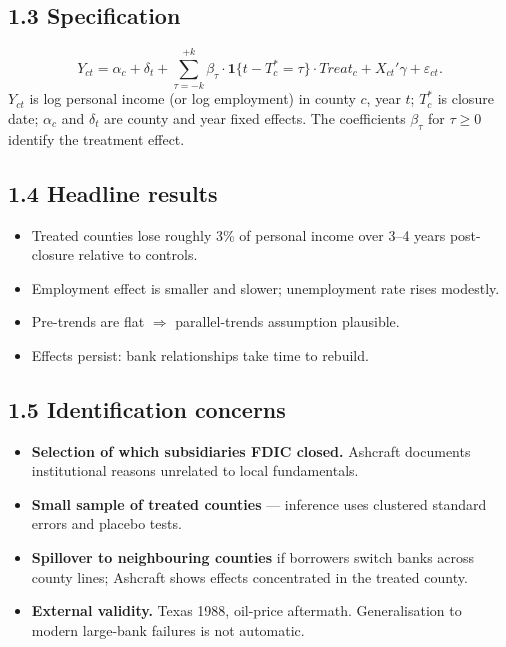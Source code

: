 \documentclass[11pt]{article}
\begin{document}
\subsection*{1.3 Specification}
\[
Y_{ct} = \alpha_c + \delta_t + \sum_{\tau=-k}^{+k}\beta_\tau\cdot\mathbf 1\{t-T_c^* = \tau\}\cdot Treat_c + X_{ct}'\gamma + \varepsilon_{ct}.
\]
$Y_{ct}$ is log personal income (or log employment) in county $c$, year $t$; $T_c^*$ is closure date; $\alpha_c$ and $\delta_t$ are county and year fixed effects. The coefficients $\beta_\tau$ for $\tau\ge 0$ identify the treatment effect.

\subsection*{1.4 Headline results}
\begin{itemize}
\item Treated counties lose roughly 3\% of personal income over 3--4 years post-closure relative to controls.
\item Employment effect is smaller and slower; unemployment rate rises modestly.
\item Pre-trends are flat $\Rightarrow$ parallel-trends assumption plausible.
\item Effects persist: bank relationships take time to rebuild.
\end{itemize}

\subsection*{1.5 Identification concerns}
\begin{alertbox}
\begin{itemize}
\item \textbf{Selection of which subsidiaries FDIC closed.} Ashcraft documents institutional reasons unrelated to local fundamentals.
\item \textbf{Small sample of treated counties} --- inference uses clustered standard errors and placebo tests.
\item \textbf{Spillover to neighbouring counties} if borrowers switch banks across county lines; Ashcraft shows effects concentrated in the treated county.
\item \textbf{External validity.} Texas 1988, oil-price aftermath. Generalisation to modern large-bank failures is not automatic.
\end{itemize}
\end{alertbox}
\end{document}
